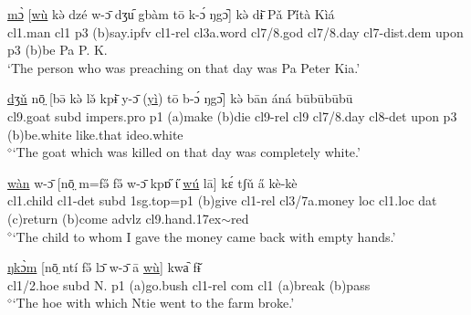 \documentclass[10pt,twoside]{article}
\newcommand{\gl}[1]{`#1'}
\def\VSP{\vspace{0pt}}
\newcommand{\cl}[1]{{\sc cl#1}}
\def\elicited{$^\diamond$}
\def\til{\raise.17ex\hbox{$\scriptstyle\mathtt{\sim}$}}	%
\def\ih{ɩ}
\begin{document}
\begin{exe}
	\ex \label{exThePersonWhoWasPreaching1} 		
		\gll \uline{mɔ̀} [\uline{wù} kə̀ dzé w-ɔ̄ dʒu᷇ gbàm tō k-ɔ́ ŋgɔ᷆] kə̀ dɨ̄ Pǎ Pi̋tà Kìá\\
		\cl1.man	\cl1 	{\sc p3}	({\sc b})say.{\sc ipfv}	\cl1-{\sc rel}	\cl3a.word \cl7/8.god	\cl7/8.day	\cl7-{\sc dist.dem}	 upon	{\sc p3}	({\sc b})be	Pa P. K. \\
		\glt \VSP \gl{The person who was preaching on that day was Pa Peter Kia.}
\end{exe}%

\begin{exe} 
	\ex \label{exGoatTheyKilled}	

		\gll	\uline{dʒǔ} nō̤ [bə̄ kə̀ lə̌ kpɨ̄ y-ɔ̄ (\uline{yì}) tō b-ɔ́ ŋgɔ᷆] kə̀ bān áná būbūbūbū			\\
			\cl9.goat {\sc subd} {\sc impers.pro} {\sc p1} ({\sc a})make ({\sc b})die \cl9-{\sc rel} \cl9  \cl7/8.day \cl8-{\sc det} upon {\sc p3} ({\sc b})be.white like.that {\sc ideo}.white		\\
		\glt \VSP \elicited \gl{The goat which was killed on that day was completely white.}
		
\end{exe}%

\begin{exe}
	\ex \label{exChildWhomIGaveMoney}	

		\gll	\uline{wàn} w-ɔ̄ [nō̤ m=fə̋ fə̋ w-ɔ̄ kpɒ̋ {\H\ih} \uline{wú} lā] kɛ́ tʃǔ a̋ kè-kè	\\
			\cl1.child \cl1-{\sc det} {\sc subd} {\sc 1sg.top}={\sc p1} ({\sc b})give	\cl1-{\sc rel} \cl3/7a.money {\sc loc} \cl1.{\sc loc} {\sc dat} ({\sc c})return ({\sc b})come {\sc advlz} \cl9.hand\til{{\sc red}} 				\\
		\glt \VSP \elicited \gl{The child to whom I gave the money came back with empty hands.}

\end{exe}%

\begin{exe}
	\ex \label{exTheHoeWithWhich}	
		\gll	\uline{ŋkɔ̀m} [nō̤ ntí fə̋ lɔ̄ w-ɔ̄ ā \uline{wù}] kwa᷆ fɨ̌  	\\
			\cl1/2.hoe {\sc subd} N. {\sc p1} ({\sc a})go.bush	\cl1-{\sc rel} {\sc com} \cl1 ({\sc a})break ({\sc b})pass 				\\
		\glt \VSP \elicited \gl{The hoe with which Ntie went to the farm broke.}
\end{exe}
\end{document}
